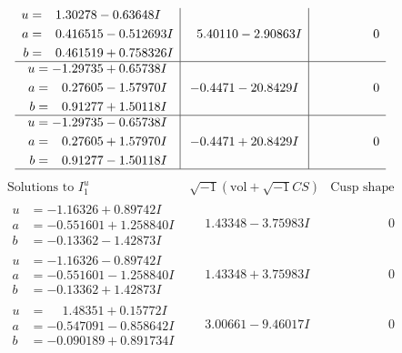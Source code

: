 \documentclass[1p]{elsarticle_modified}
\theoremstyle{definition}
\newcommand{\I}{\sqrt{-1}}
\begin{document}
$$\begin{array}{c|c|c}
\begin{aligned}
u &= \phantom{-}1.30278 - 0.63648 I \\
a &= \phantom{-}0.416515 - 0.512693 I \\
b &= \phantom{-}0.461519 + 0.758326 I\end{aligned}
 & \phantom{-}5.40110 - 2.90863 I & \phantom{-0.000000 } 0 \\ \hline\begin{aligned}
u &= -1.29735 + 0.65738 I \\
a &= \phantom{-}0.27605 - 1.57970 I \\
b &= \phantom{-}0.91277 + 1.50118 I\end{aligned}
 & -0.4471 - 20.8429 I & \phantom{-0.000000 } 0 \\ \hline\begin{aligned}
u &= -1.29735 - 0.65738 I \\
a &= \phantom{-}0.27605 + 1.57970 I \\
b &= \phantom{-}0.91277 - 1.50118 I\end{aligned}
 & -0.4471 + 20.8429 I & \phantom{-0.000000 } 0\\
 \hline 
 \end{array}$$\newpage$$\begin{array}{c|c|c}  
\text{Solutions to }I^u_{1}& \I (\text{vol} + \sqrt{-1}CS) & \text{Cusp shape}\\
 \hline 
\begin{aligned}
u &= -1.16326 + 0.89742 I \\
a &= -0.551601 + 1.258840 I \\
b &= -0.13362 - 1.42873 I\end{aligned}
 & \phantom{-}1.43348 - 3.75983 I & \phantom{-0.000000 } 0 \\ \hline\begin{aligned}
u &= -1.16326 - 0.89742 I \\
a &= -0.551601 - 1.258840 I \\
b &= -0.13362 + 1.42873 I\end{aligned}
 & \phantom{-}1.43348 + 3.75983 I & \phantom{-0.000000 } 0 \\ \hline\begin{aligned}
u &= \phantom{-}1.48351 + 0.15772 I \\
a &= -0.547091 - 0.858642 I \\
b &= -0.090189 + 0.891734 I\end{aligned}
 & \phantom{-}3.00661 - 9.46017 I & \phantom{-0.000000 } 0 \\ \hline\begin{aligned}

\end{aligned}
\end{array}$$
\end{document}
